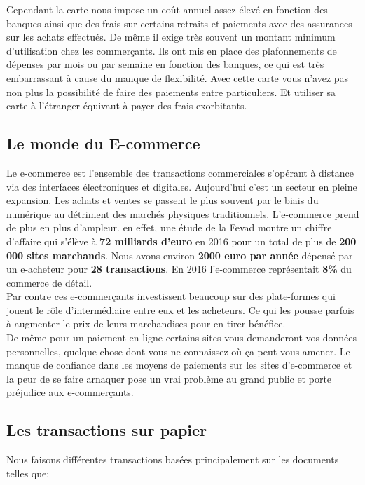 \documentclass[12pt]{report}
\begin{document}
\hspace{1cm} Cependant la carte nous impose un coût annuel assez élevé en fonction des banques ainsi que des frais sur certains retraits et paiements avec des assurances sur les achats effectués. De même il exige très souvent un montant minimum d'utilisation chez les commerçants. Ils ont mis en place des plafonnements de dépenses par mois ou par semaine en fonction des banques, ce qui est très embarrassant à cause du manque de flexibilité. Avec cette carte vous n'avez pas non plus la possibilité de faire des paiements entre particuliers. Et utiliser sa carte à l'étranger équivaut à payer des frais exorbitants.

    \subsection{Le monde du E-commerce}
\hspace{1cm} Le e-commerce est l'ensemble des transactions commerciales s'opérant à distance via des interfaces électroniques et digitales. Aujourd'hui c'est un secteur en pleine expansion. Les achats et ventes se passent le plus souvent par le biais du numérique au détriment des marchés physiques traditionnels. L'e-commerce prend de plus en plus d'ampleur. en effet, une étude de la Fevad montre un chiffre d'affaire qui s'élève à \textbf{72 milliards d'euro} en 2016 pour un total de plus de \textbf{200 000 sites marchands}. Nous avons environ \textbf{2000 euro par année} dépensé par un e-acheteur pour \textbf{28 transactions}. En 2016 l'e-commerce représentait \textbf{8\%} du commerce de détail.\\

\hspace{1cm} Par contre ces e-commerçants investissent beaucoup sur des plate-formes qui jouent le rôle d'intermédiaire entre eux et les acheteurs. Ce qui les pousse parfois à augmenter le prix de leurs marchandises pour en tirer bénéfice.\\ De même pour un paiement en ligne certains sites vous demanderont vos données personnelles, quelque chose dont vous ne connaissez où ça peut vous amener. Le manque de confiance dans les moyens de paiements sur les sites d'e-commerce et la peur de se faire arnaquer pose un vrai problème au grand public et porte préjudice aux e-commerçants. 


    \subsection{Les transactions sur papier}
\hspace{1cm} Nous faisons différentes transactions basées principalement sur les documents telles que:
\end{document}
